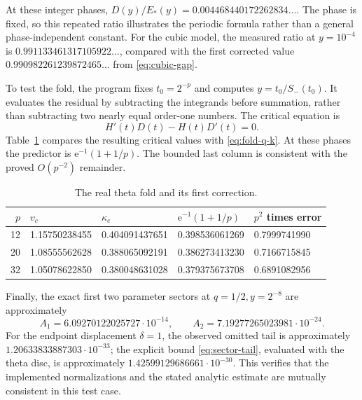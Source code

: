 \documentclass[11pt,a4paper]{article}
\numberwithin{equation}{section}
\theoremstyle{definition}
\theoremstyle{remark}
\newcommand{\ee}{\mathrm e}
\begin{document}
At these integer phases,
\(D(y)/E_*(y)=0.004468440172262834\ldots\).
The phase is fixed, so this repeated ratio illustrates the periodic
formula rather than a general phase-independent constant.
For the cubic model, the measured ratio at \(y=10^{-4}\) is
\(0.991133461317105922\ldots\), compared with the first corrected value
\(0.990982261239872465\ldots\) from \eqref{eq:cubic-gap}.

To test the fold, the program fixes \(t_0=2^{-p}\) and computes
\(y=t_0/S_-(t_0)\). It evaluates the residual by subtracting the
integrands before summation, rather than subtracting two nearly equal
order-one numbers. The critical equation is
\begin{equation}
 H'(t)D(t)-H(t)D'(t)=0.
 \label{eq:numeric-fold}
\end{equation}
Table~\ref{tab:fold} compares the resulting critical values with
\eqref{eq:fold-q-k}. At these phases the predictor is
\(\ee^{-1}(1+1/p)\). The bounded last column is consistent with the
proved \(O(p^{-2})\) remainder.

\begin{table}[htbp]
\centering
\caption{The real theta fold and its first correction.}
\label{tab:fold}
\begin{tabular}{@{}rllll@{}}
\toprule
\(p\) & \(v_c\) & \(\kappa_c\) & \(\ee^{-1}(1+1/p)\)
& \(p^2\) times error\\
\midrule
12 & 1.15750238455 & 0.404091437651 & 0.398536061269 & 0.7999741990\\
20 & 1.08555562628 & 0.388065092191 & 0.386273413230 & 0.7166715845\\
32 & 1.05078622850 & 0.380048631028 & 0.379375673708 & 0.6891082956\\
\bottomrule
\end{tabular}
\end{table}

Finally, the exact first two parameter sectors at \(q=1/2,y=2^{-8}\)
are approximately
\[
 A_1=6.09270122025727\cdot10^{-14},\qquad
 A_2=7.19277265023981\cdot10^{-24}.
\]
For the endpoint displacement \(\delta=1\), the observed omitted tail
is approximately \(1.20633833887303\cdot10^{-33}\); the explicit bound
\eqref{eq:sector-tail}, evaluated with the theta disc, is approximately
\(1.42599129686661\cdot10^{-30}\). This verifies that the implemented
normalizations and the stated analytic estimate are mutually consistent
in this test case.
\end{document}

